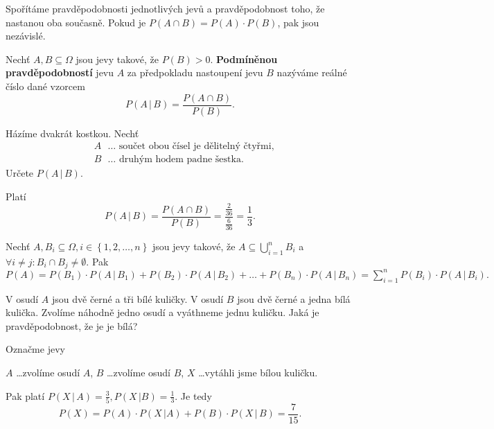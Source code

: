 \begin{reseni}
Spořítáme pravděpodobnosti jednotlivých jevů a pravděpodobnost toho, že nastanou
oba současně. Pokud je $P(A\cap B)=P(A)\cdot P(B)$, pak jsou nezávislé.
\end{reseni}

\begin{definition}
    Nechť $A,B\subseteq \Omega$ jsou jevy takové, že $P(B)>0.$ \textbf{Podmíněnou
    pravděpodobností} jevu $A$ za předpokladu nastoupení jevu $B$ nazýváme reálné
    číslo dané vzorcem
    $$P(A\, | \, B) = \frac{P(A\cap B)}{P(B)}.$$
\end{definition}

\begin{priklad}
Házíme dvakrát kostkou. Nechť
\begin{align*}
    &A \textrm{ } \dots  \textrm{ součet obou čísel je dělitelný čtyřmi,}\\
    &B \textrm{ } \dots  \textrm{ druhým hodem padne šestka}.
\end{align*}
Určete $P(A\, |\, B).$
\end{priklad}

\begin{reseni}
Platí
$$P(A\, |\, B)=\frac{P(A\cap B)}{P(B)}=\frac{\frac{2}{36}}{\frac{6}{36}}=\frac{1}{3}.$$
\end{reseni}

\begin{veta}
    Nechť $A,B_i \subseteq \Omega, i \in \left \{ 1, 2, \dots, n \right \} $ jsou jevy
    takové, že $A\subseteq \bigcup_{i=1}^n B_i$ a $\forall i\ne j: B_i\cap B_j\ne
    \emptyset.$ Pak $P(A)=P(B_1)\cdot P(A\, |\, B_1) + P(B_2)\cdot P(A \, |\, B_2)+
    \dots + P(B_n)\cdot P(A \,|\, B_n)=\sum_{i=1}^n P(B_i)\cdot P(A\, |\, B_i).$
\end{veta}

\begin{priklad}
V osudí $A$ jsou dvě černé a tři bílé kuličky. V osudí $B$ jsou dvě černé a jedna
bílá kulička. Zvolíme náhodně jedno osudí a vyáthneme jednu kuličku. Jaká
je pravděpodobnost, že je je bílá?
\end{priklad}

\begin{reseni}
Označme jevy
\begin{center}
    $A$ \dots zvolíme osudí $A$,
    $B$ \dots zvolíme osudí $B$,
    $X$ \dots vytáhli jsme bílou kuličku.
\end{center}
Pak platí
$P(X \, | \, A) = \frac{3}{5}, P(X \, | B)=\frac{1}{3}.$ Je tedy
$$P(X)=P(A)\cdot P(X \, | A)+P(B)\cdot P(X\, | \, B)=\frac{7}{15}.$$
\end{reseni}

